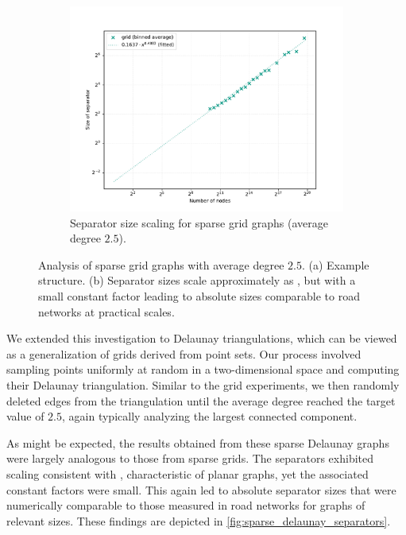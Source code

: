 \begin{figure}
\begin{subfigure}{0.55\linewidth}
        \centering
        \includegraphics[width=\linewidth]{graphics/sep_grid_avg_deg.png}
        \caption{Separator size scaling for sparse grid graphs (average degree \(2.5\)).}
        \label{fig:sparse_grid_sep_plot} %
    \end{subfigure}
    \caption{Analysis of sparse grid graphs with average degree \(2.5\). (a) Example structure. (b) Separator sizes scale approximately as , but with a small constant factor leading to absolute sizes comparable to road networks at practical scales.}
    \label{fig:sparse_grid_separators} %
\end{figure}

We extended this investigation to Delaunay triangulations, which can be viewed as a generalization of grids derived from point sets.
Our process involved sampling points uniformly at random in a two-dimensional space and computing their Delaunay triangulation.
Similar to the grid experiments, we then randomly deleted edges from the triangulation until the average degree reached the target value of \(2.5\), again typically analyzing the largest connected component.

As might be expected, the results obtained from these sparse Delaunay graphs were largely analogous to those from sparse grids.
The separators exhibited scaling consistent with , characteristic of planar graphs, yet the associated constant factors were small.
This again led to absolute separator sizes that were numerically comparable to those measured in road networks for graphs of relevant sizes.
These findings are depicted in \cref{fig:sparse_delaunay_separators}.

